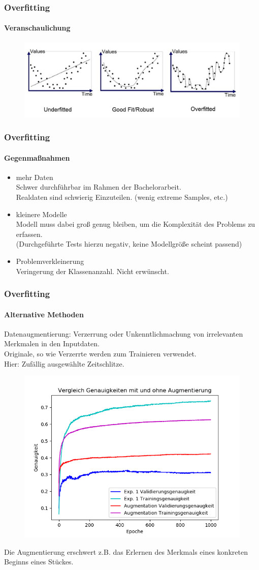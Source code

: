 \documentclass{beamer}
\begin{document}
\frame
{
	\frametitle{Overfitting}
	\framesubtitle{Veranschaulichung}
		\begin{figure}[h!]
		\centering
		\includegraphics[width=0.9\linewidth,height=0.9\textheight, keepaspectratio]{res/old/overfitting_expl.png}
	\footnotemark
	\end{figure}


}

\frame
{
	\frametitle{Overfitting}
	\framesubtitle{Gegenmaßnahmen}
	\begin{itemize}
		\item mehr Daten\\
			Schwer durchführbar im Rahmen der Bachelorarbeit.\\
			Realdaten sind schwierig Einzuteilen. (wenig extreme Samples, etc.)
		\item kleinere Modelle\\
	Modell muss dabei groß genug bleiben, um die Komplexität des Problems zu erfassen.\\
		(Durchgeführte Tests hierzu negativ, keine Modellgröße scheint passend)
		\item Problemverkleinerung\\
	Veringerung der Klassenanzahl. Nicht erwünscht.
	\end{itemize}
}

\frame
{
	\frametitle{Overfitting}
	\framesubtitle{Alternative Methoden}
	Datenaugmentierung: Verzerrung oder Unkenntlichmachung von irrelevanten Merkmalen in den Inputdaten.\\
	Originale, so wie Verzerrte werden zum Trainieren verwendet.\\
	Hier: Zufällig ausgewählte Zeitschlitze.
	\begin{figure}[h!]
		\centering
		\includegraphics[width=0.5\linewidth,height=0.5\textheight, keepaspectratio]{res/old/augmentation.png}
	\end{figure}
	Die Augmentierung erschwert z.B. das Erlernen des Merkmals eines konkreten Beginns eines Stückes.
}
\end{document}
